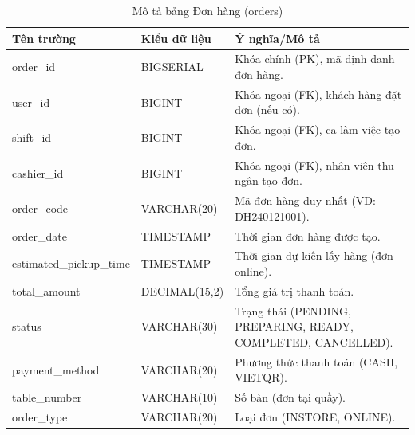\documentclass[../20232006p.tex]{subfiles}
\begin{document}
\begin{table}[H]
    \centering
    \caption{Mô tả bảng Đơn hàng (orders)}
    \label{tab:orders}
    \begin{tabular}{|p{4cm}|p{3cm}|p{7cm}|}
        \hline
        \textbf{Tên trường}     & \textbf{Kiểu dữ liệu} & \textbf{Ý nghĩa/Mô tả}                                        \\
        \hline
        order\_id               & BIGSERIAL             & Khóa chính (PK), mã định danh đơn hàng.                       \\
        \hline
        user\_id                & BIGINT                & Khóa ngoại (FK), khách hàng đặt đơn (nếu có).                 \\
        \hline
        shift\_id               & BIGINT                & Khóa ngoại (FK), ca làm việc tạo đơn.                         \\
        \hline
        cashier\_id             & BIGINT                & Khóa ngoại (FK), nhân viên thu ngân tạo đơn.                  \\
        \hline
        order\_code             & VARCHAR(20)           & Mã đơn hàng duy nhất (VD: DH240121001).                       \\
        \hline
        order\_date             & TIMESTAMP             & Thời gian đơn hàng được tạo.                                  \\
        \hline
        estimated\_pickup\_time & TIMESTAMP             & Thời gian dự kiến lấy hàng (đơn online).                      \\
        \hline
        total\_amount           & DECIMAL(15,2)         & Tổng giá trị thanh toán.                                      \\
        \hline
        status                  & VARCHAR(30)           & Trạng thái (PENDING, PREPARING, READY, COMPLETED, CANCELLED). \\
        \hline
        payment\_method         & VARCHAR(20)           & Phương thức thanh toán (CASH, VIETQR).                        \\
        \hline
        table\_number           & VARCHAR(10)           & Số bàn (đơn tại quầy).                                        \\
        \hline
        order\_type             & VARCHAR(20)           & Loại đơn (INSTORE, ONLINE).                                   \\
        \hline
    \end{tabular}
\end{table}
\end{document}
